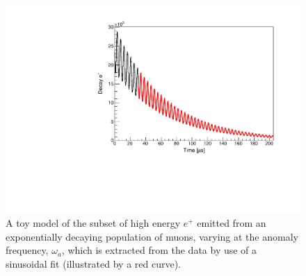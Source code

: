 

%




\begin{figure}[t!]
\centering{}
\includegraphics[trim={0cm 0cm 0cm 0cm},clip,width=.69\textwidth]{Images/Chapter2/ToyWiggle.pdf}
\caption{A toy model of the subset of high energy $e^{+}$ emitted from an exponentially decaying population of muons, varying at the anomaly frequency, $\omega_{a}$, which is extracted from the data by use of a sinusoidal fit (illustrated by a red curve).}
\label{fig:ToyWiggle}
\end{figure}

